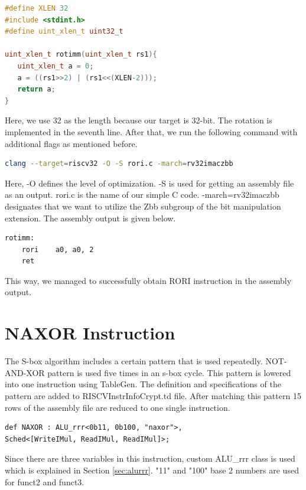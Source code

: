 \begin{lstlisting}[language=C++]
#define XLEN 32
#include <stdint.h>
#define uint_xlen_t uint32_t

uint_xlen_t rotimm(uint_xlen_t rs1){
   uint_xlen_t a = 0;
   a = ((rs1>>2) | (rs1<<(XLEN-2)));
   return a;
}
\end{lstlisting}

Here, we use 32 as the length because our target is 32-bit. The rotation is implemented in the seventh line. After that, we run the following command with additional flags as mentioned before.

\begin{lstlisting}[language=Bash]
clang --target=riscv32 -O -S rori.c -march=rv32imaczbb
\end{lstlisting}

Here, -O defines the level of optimization. -S is used for getting an assembly file as an output. rori.c is the name of our simple C code. -march=rv32imaczbb designates that we want to utilize the Zbb subgroup of the bit manipulation extension. The assembly output is given below.%

\begin{lstlisting}
rotimm:
	rori	a0, a0, 2
	ret
\end{lstlisting}

This way, we managed to successfully obtain RORI instruction in the assembly output.

\section{NAXOR Instruction}\label{sec:naxor}

The S-box algorithm includes a certain pattern that is used repeatedly. NOT-AND-XOR pattern is used five times in an s-box cycle. This pattern is lowered into one instruction using TableGen. The definition and specifications of the pattern are added to RISCVInstrInfoCrypt.td file. After matching this pattern 15 rows of the assembly file are reduced to one single instruction. 

\begin{lstlisting}
def NAXOR : ALU_rrr<0b11, 0b100, "naxor">,
Sched<[WriteIMul, ReadIMul, ReadIMul]>;
\end{lstlisting}

Since there are three variables in this instruction, custom ALU\_rrr class is used which is explained in Section \ref{sec:alurrr}. "11" and "100" base 2 numbers are used for funct2 and funct3.

